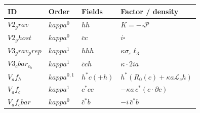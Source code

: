 \begin{center}\begin{tabular}{llll}
ID & Order & Fields & Factor / density \\
\midrule
$V2_grav$ & $kappa^0$ & $hh$ & $K=-\square\mathcal P$ \\
$V2_ghost$ & $kappa^0$ & $\bar c c$ & $i\square$ \\
$V3_grav_prep$ & $kappa^1$ & $hhh$ & $\kappa\sigma_\varepsilon\ell_3$ \\
$V3_cbar_c_h$ & $kappa^1$ & $\bar c c h$ & $\kappa\cdot 2ia$ \\
$V_af_h$ & $kappa^{0,1}$ & $h^*c(+h)$ & $h^*(R_0(c)+\kappa a\mathcal L_c h)$ \\
$V_af_c$ & $kappa^1$ & $c^*cc$ & $-\kappa a\,c^*(c\cdot\partial c)$ \\
$V_af_cbar$ & $kappa^0$ & $\bar c^*b$ & $-i\,\bar c^*b$ \\
\end{tabular}\end{center}